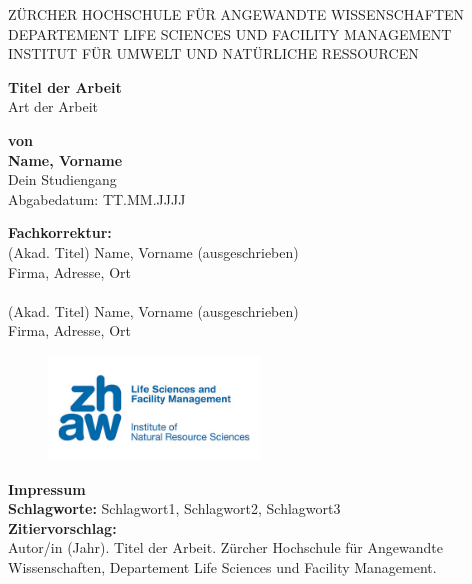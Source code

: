 \documentclass[a4paper,11pt,twoside]{article}
\begin{document}
	
	\begin{titlepage}
		\centering
		{\large \MakeUppercase{Zürcher Hochschule für Angewandte Wissenschaften}\\
			\MakeUppercase{Departement Life Sciences und Facility Management}\\
			\MakeUppercase{Institut für Umwelt und natürliche Ressourcen}\\[1.5cm]}
		
		{\Large \textbf{Titel der Arbeit}\\[1cm]}
		{\large{Art der Arbeit}\\[2cm]}
		
		\begin{center}
			\textbf{von}\\
			\textbf{Name, Vorname}\\
			Dein Studiengang\\
			Abgabedatum: TT.MM.JJJJ
		\end{center}
		
		\vspace{3cm}
		\begin{tabbing}
			\textbf{Fachkorrektur:} \\
			(Akad. Titel) Name, Vorname (ausgeschrieben)\\
			Firma, Adresse, Ort\\
			\\%
			(Akad. Titel) Name, Vorname (ausgeschrieben)\\
			Firma, Adresse, Ort\\
		\end{tabbing}
			
		\vfill
		\begin{figure}[t]
			\raggedleft
			\includegraphics[width=0.5\textwidth]{zhaw.jpg} %
		\end{figure}
	\end{titlepage}
	
	
	\newpage
	\thispagestyle{empty}
	\vspace*{18cm}
	\noindent
	\textbf{Impressum}\\[1cm]
	\textbf{Schlagworte:} Schlagwort1, Schlagwort2, Schlagwort3\\[0.5cm]
	\textbf{Zitiervorschlag:}\\
	Autor/in (Jahr). Titel der Arbeit. Zürcher Hochschule für Angewandte Wissenschaften, Departement Life Sciences und Facility Management.
	
\end{document}
